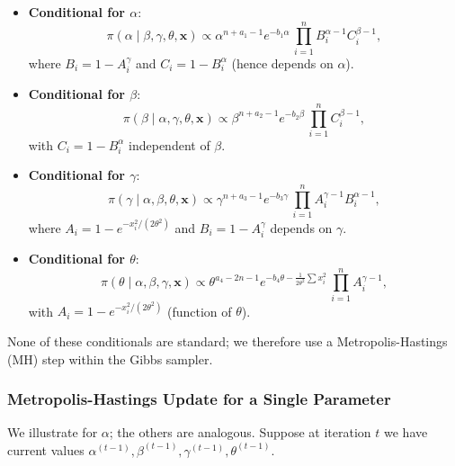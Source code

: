 \documentclass[12pt]{article}
\begin{document}
\begin{itemize}
    \item \textbf{Conditional for \(\alpha\)}:
    \[
    \pi(\alpha\mid\beta,\gamma,\theta,\mathbf{x}) \propto
    \alpha^{n+a_1-1}e^{-b_1\alpha}\,
    \prod_{i=1}^{n} B_i^{\alpha-1} C_i^{\beta-1},
    \]
    where \(B_i = 1 - A_i^{\gamma}\) and \(C_i = 1 - B_i^{\alpha}\) (hence depends on \(\alpha\)).



    \item \textbf{Conditional for \(\beta\)}:
    \[
    \pi(\beta\mid\alpha,\gamma,\theta,\mathbf{x}) \propto
    \beta^{n+a_2-1}e^{-b_2\beta}\,
    \prod_{i=1}^{n} C_i^{\beta-1},
    \]
    with \(C_i = 1 - B_i^{\alpha}\) independent of \(\beta\).



    \item \textbf{Conditional for \(\gamma\)}:
    \[
    \pi(\gamma\mid\alpha,\beta,\theta,\mathbf{x}) \propto
    \gamma^{n+a_3-1}e^{-b_3\gamma}\,
    \prod_{i=1}^{n} A_i^{\gamma-1} B_i^{\alpha-1},
    \]
    where \(A_i = 1-e^{-x_i^{2}/(2\theta^{2})}\) and \(B_i = 1 - A_i^{\gamma}\) depends on \(\gamma\).



    \item \textbf{Conditional for \(\theta\)}:
    \[
    \pi(\theta\mid\alpha,\beta,\gamma,\mathbf{x}) \propto
    \theta^{a_4-2n-1}e^{-b_4\theta - \frac{1}{2\theta^{2}}\sum x_i^{2}}\,
    \prod_{i=1}^{n} A_i^{\gamma-1},
    \]
    with \(A_i = 1-e^{-x_i^{2}/(2\theta^{2})}\) (function of \(\theta\)).
\end{itemize}



None of these conditionals are standard; we therefore use a Metropolis-Hastings
(MH) step within the Gibbs sampler.



\subsubsection{Metropolis-Hastings Update for a Single Parameter}



We illustrate for \(\alpha\); the others are analogous. Suppose at iteration \(t\)
we have current values \(\alpha^{(t-1)},\beta^{(t-1)},\gamma^{(t-1)},\theta^{(t-1)}\).
\end{document}

